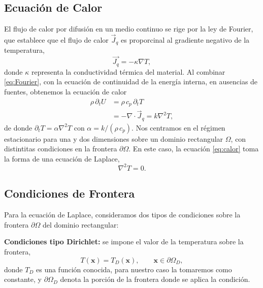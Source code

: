 \documentclass[11pt,a4paper,twocolumn]{article}
\begin{document}
\subsection{Ecuación de Calor}
El flujo de calor por difusión en un medio continuo se rige por la ley de Fourier,
que establece que el flujo de calor $\vec{J}_{q}$ es proporcinal al gradiente negativo
de la temperatura,
\begin{equation}
       \vec{J_q} = - \kappa \nabla T,
       \label{eq:Fourier}
\end{equation}
donde $\kappa$ representa la conductividad térmica del material.
Al combinar \eqref{eq:Fourier}, con la ecuación de continuidad de la energía interna,
en ausencias de fuentes, obtenemos la ecuación de calor
\begin{equation}
\begin{aligned}
\rho \, \partial_t U &= \rho \, c_p \, \partial_t T \\
                     &= -\nabla \cdot \vec{J}_{q} = k \nabla^2 T,
\end{aligned}
\label{eq:calor}
\end{equation}
de donde $\partial_t T = \alpha \nabla^2 T$ con $\alpha = k/(\rho \, c_p)$.
Nos centramos en el régimen estacionario para una y dos dimensiones sobre un
dominio rectangular $\Omega$, con distintitas condiciones en la frontera $\partial \Omega$.
En este caso, la ecuación \eqref{eq:calor} toma la forma de una ecuación de Laplace,
\begin{equation}
       \nabla^2 T = 0.
       \label{eq:Laplace}
\end{equation}

\subsection{Condiciones de Frontera}

Para la ecuación de Laplace, consideramos dos tipos de condiciones sobre la frontera $\partial \Omega$ del dominio rectangular:

\textbf{Condiciones tipo Dirichlet:} se impone el valor de la temperatura sobre la frontera,
\begin{equation}
T(\mathbf{x}) = T_D(\mathbf{x}), \qquad \mathbf{x} \in \partial\Omega_D,
\label{eq:Dirichlet}
\end{equation}
donde $T_D$ es una función conocida, para nuestro caso la tomaremos como constante, y $\partial \Omega_D$
denota la porción de la frontera donde se aplica la condición.
\end{document}
